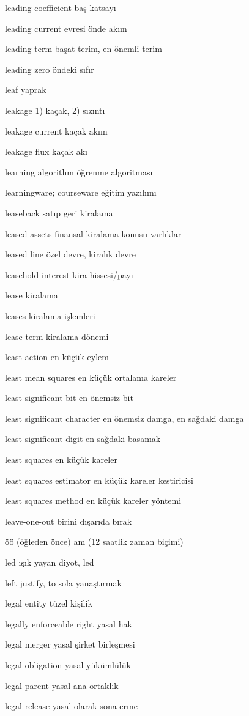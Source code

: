 \documentclass[12pt,fleqn]{article}\usepackage{../../common}
\begin{document}
leading coefficient baş katsayı

leading current evresi önde akım

leading term başat terim, en önemli terim

leading zero öndeki sıfır

leaf yaprak

leakage 1) kaçak, 2) sızıntı

leakage current kaçak akım

leakage flux kaçak akı

learning algorithm öğrenme algoritması

learningware; courseware eğitim yazılımı

leaseback satıp geri kiralama

leased assets finansal kiralama konusu varlıklar

leased line özel devre, kiralık devre

leasehold interest kira hissesi/payı

lease kiralama

leases kiralama işlemleri

lease term kiralama dönemi

least action en küçük eylem

least mean squares en küçük ortalama kareler

least significant bit en önemsiz bit

least significant character en önemsiz damga, en sağdaki damga

least significant digit en sağdaki basamak

least squares en küçük kareler

least squares estimator en küçük kareler kestiricisi

least squares method en küçük kareler yöntemi

leave-one-out birini dışarıda bırak

öö (öğleden önce) am (12 saatlik zaman biçimi)

led ışık yayan diyot, led

left justify, to sola yanaştırmak

legal entity tüzel kişilik

legally enforceable right yasal hak

legal merger yasal şirket birleşmesi

legal obligation yasal yükümlülük

legal parent yasal ana ortaklık

legal release yasal olarak sona erme
\end{document}
